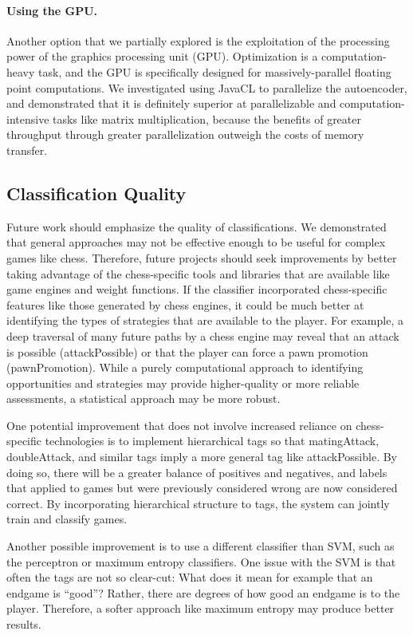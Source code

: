 \documentclass[11pt]{article}
\begin{document}
\paragraph{Using the GPU.}
Another option that we partially explored is the exploitation of the processing power of the graphics processing unit (GPU). Optimization is a computation-heavy task, and the GPU is specifically designed for massively-parallel floating point computations. We investigated using JavaCL to parallelize the autoencoder, and demonstrated that it is definitely superior at parallelizable and computation-intensive tasks like matrix multiplication, because the benefits of greater throughput through greater parallelization outweigh the costs of memory transfer.

\subsection{Classification Quality}
Future work should emphasize the quality of classifications. We demonstrated that general approaches may not be effective enough to be useful for complex games like chess. Therefore, future projects should seek improvements by better taking advantage of the chess-specific tools and libraries that are available like game engines and weight functions. If the classifier incorporated chess-specific features like those generated by chess engines, it could be much better at identifying the types of strategies that are available to the player. For example, a deep traversal of many future paths by a chess engine may reveal that an attack is possible (attackPossible) or that the player can force a pawn promotion (pawnPromotion). While a purely computational approach to identifying opportunities and strategies may provide higher-quality or more reliable assessments, a statistical approach may be more robust. %

One potential improvement that does not involve increased reliance on chess-specific technologies is to implement hierarchical tags so that matingAttack, doubleAttack, and similar tags imply a more general tag like attackPossible. By doing so, there will be a greater balance of positives and negatives, and labels that applied to games but were previously considered wrong are now considered correct. By incorporating hierarchical structure to tags, the system can jointly train and classify games.

Another possible improvement is to use a different classifier than SVM, such as the perceptron or maximum entropy classifiers. One issue with the SVM is that often the tags are not so clear-cut: What does it mean for example that an endgame is “good”? Rather, there are degrees of how good an endgame is to the player. Therefore, a softer approach like maximum entropy may produce better results.
\end{document}
